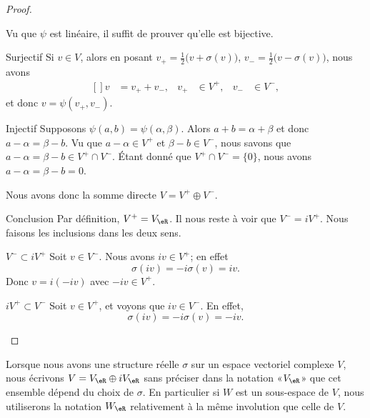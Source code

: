 \begin{proof}
\begin{subproof}
        Vu que \( \psi\) est linéaire, il suffit de prouver qu'elle est bijective.
        \begin{subproof}
        \item[Surjectif]
            Si \( v\in V\), alors en posant \( v_+=\frac{ 1 }{2}\big( v+\sigma(v) \big)\), \( v_-=\frac{ 1 }{2}\big( v-\sigma(v) \big)\), nous avons
            \begin{equation}
                \begin{aligned}[]
                    v&=v_++v_-, & v_+&\in V^+, & v_-&\in V^-,
                \end{aligned}
            \end{equation}
            et donc \( v=\psi(v_+,v_-)\).
        \item[Injectif]
            Supposons \( \psi(a,b)=\psi(\alpha,\beta)\). Alors \( a+b=\alpha+\beta\) et donc \( a-\alpha=\beta-b\). Vu que \( a-\alpha\in V^+\)  et \( \beta-b\in V^- \), nous savons que \( a-\alpha=\beta-b\in V^+\cap V^-\). Étant donné que \( V^+\cap V^-=\{ 0 \}\), nous avons \( a-\alpha=\beta-b=0\).
    \end{subproof}
    Nous avons donc la somme directe \( V=V^+\oplus V^-\).
\item[Conclusion]
    Par définition, \( V^+=V_{\eR}\). Il nous reste à voir que \( V^-=iV^+\). Nous faisons les inclusions dans les deux sens.
    \begin{subproof}
    \item[\( V^-\subset iV^+\)]
        Soit \( v\in V^-\). Nous avons \( iv\in V^+\); en effet
        \begin{equation}
            \sigma(iv)=-i\sigma(v)=iv.
        \end{equation}
        Donc \( v=i(-iv)\) avec \( -iv\in V^+\).
    \item[$iV^+\subset V^-$]
        Soit \( v\in V^+\), et voyons que \( iv\in V^-\). En effet,
        \begin{equation}
            \sigma(iv)=-i\sigma(v)=-iv.
        \end{equation}
    \end{subproof}
            \end{subproof}
\end{proof}

\begin{normaltext}
    Lorsque nous avons une structure réelle \( \sigma\) sur un espace vectoriel complexe \( V\), nous écrivons \( V=V_{\eR}\oplus iV_{\eR}\) sans préciser dans la notation «\( V_{\eR}\)» que cet ensemble dépend du choix de \( \sigma\). En particulier si \( W\) est un sous-espace de \( V\), nous utiliserons la notation \( W_{\eR}\) relativement à la même involution que celle de \( V\).
\end{normaltext}


